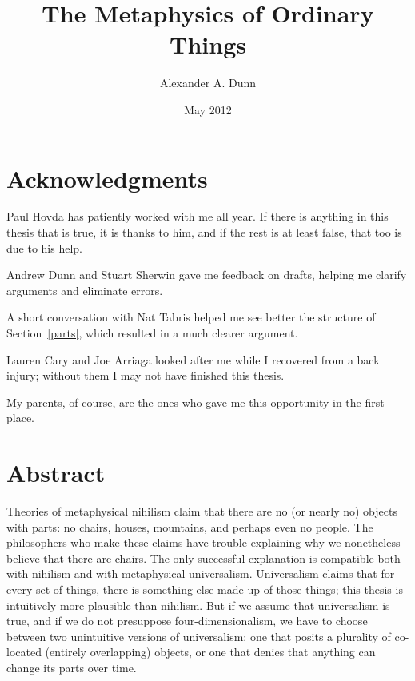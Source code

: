 \documentclass[12pt,twoside]{reedfancy}
\title{The Metaphysics of Ordinary Things}
\author{Alexander A. Dunn}
\date{May 2012}
\begin{document}
  \maketitle
  \frontmatter %
  \pagestyle{empty} %

\begin{spacing}{1.25}

\chapter*{Acknowledgments}
Paul Hovda has patiently worked with me all year.  If there is
anything in this thesis that is true, it is thanks to him, and if the
rest is at least false, that too is due to his help.

Andrew Dunn and Stuart Sherwin gave me feedback on drafts, helping me
clarify arguments and eliminate errors.

A short conversation with Nat Tabris helped me see better the
structure of Section~\ref{parts}, which resulted in a much clearer
argument.

Lauren Cary and Joe Arriaga looked after me while I recovered from a
back injury; without them I may not have finished this thesis.

My parents, of course, are the ones who gave me this opportunity in
the first place.


\tableofcontents


\chapter*{Abstract}
Theories of metaphysical nihilism claim that there are no (or nearly
no) objects with parts: no chairs, houses, mountains, and perhaps even
no people.  The philosophers who make these claims have trouble
explaining why we nonetheless believe that there are chairs.  The only
successful explanation is compatible both with nihilism and with
metaphysical universalism.  Universalism claims that for every set of
things, there is something else made up of those things; this thesis
is intuitively more plausible than nihilism.  But if we assume that
universalism is true, and if we do not presuppose four-dimensionalism,
we have to choose between two unintuitive versions of universalism:
one that posits a plurality of co-located (entirely overlapping)
objects, or one that denies that anything can change its parts over
time.


\end{spacing}
\end{document}
